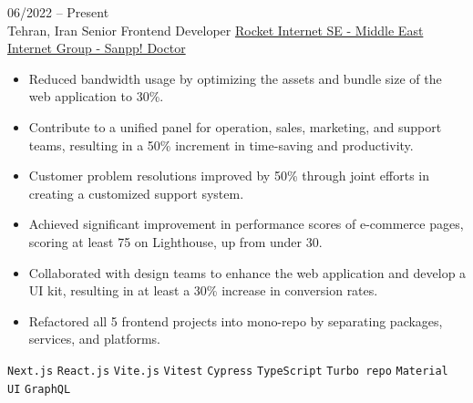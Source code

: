 \documentclass[8pt]{developercv} %
\begin{document}
    \vspace{-10 pt}
    \begin{entrylist}
        \entry
        {06/2022 -- Present \\ Tehran, Iran}
        {Senior Frontend Developer}
        {\href{https://snapp.doctor/}{Rocket Internet SE - Middle East Internet Group - Sanpp! Doctor}}
        {\vspace{-10pt}
            \begin{itemize}[noitemsep,topsep=0pt,parsep=0pt,partopsep=0pt, leftmargin=-1pt]
                \item Reduced bandwidth usage by optimizing the assets and bundle size of the web application to 30\%.
                \item Contribute to a unified panel for operation, sales, marketing, and support teams, resulting in a 50\% increment in time-saving and productivity.
                \item Customer problem resolutions improved by 50\% through joint efforts in creating a customized support system.
                \item Achieved significant improvement in performance scores of e-commerce pages, scoring at least 75 on Lighthouse, up from under 30.
                \item Collaborated with design teams to enhance the web application and develop a UI kit, resulting in at least a 30\% increase in conversion rates.
                \item Refactored all 5 frontend projects into mono-repo by separating packages, services, and platforms.
            \end{itemize}
            \texttt{Next.js} \slashsep \texttt{React.js} \slashsep \texttt{Vite.js} \slashsep \texttt{Vitest} \slashsep \texttt{Cypress} \slashsep \texttt{TypeScript} \slashsep \texttt{Turbo repo} \slashsep \texttt{Material UI} \slashsep \texttt{GraphQL}
        }


\end{entrylist}
\end{document}
